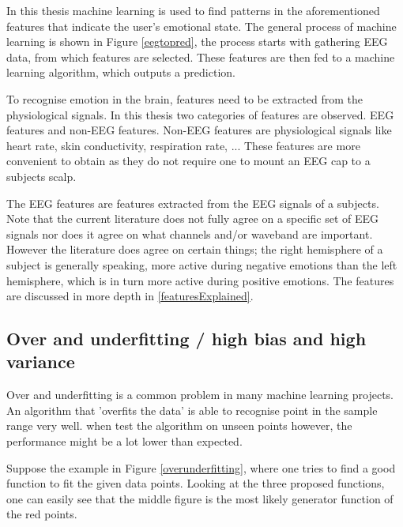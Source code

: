\npar

In this thesis machine learning is used to find patterns in the aforementioned features that indicate the user's emotional state. The general process of machine learning is shown in Figure \ref{eegtopred}, the process starts with gathering EEG data, from which features are selected. These features are then fed to a machine learning algorithm, which outputs a prediction.


To recognise emotion in the brain, features need to be extracted from the physiological signals. In this thesis two categories of features are observed. EEG features and non-EEG features. Non-EEG features are physiological signals like heart rate, skin conductivity, respiration rate, ... These features are more convenient to obtain as they do not require one to mount an EEG cap to a subjects scalp. 

\npar

The EEG features are features extracted from the EEG signals of a subjects. Note that the current literature does not fully agree on a specific set of EEG signals nor does it agree on what channels and/or waveband are important. However the literature does agree on certain things; the right hemisphere of a subject is generally speaking, more active during negative emotions than the left hemisphere, which is in turn more active during positive emotions\cite{RealTimeEEGEmotion,EEGDatasets,killyPaper}. The features are discussed in more depth in \ref{featuresExplained}.

\subsection{Over and underfitting / high bias and high variance}

Over and underfitting is a common problem in many machine learning projects. An algorithm that 'overfits the data' is able to recognise point in the sample range very well. when test the algorithm on unseen points however, the performance might be a lot lower than expected.


Suppose the example in Figure \ref{overunderfitting}, where one tries to find a good function to fit the given data points. Looking at the three proposed functions, one can easily see that the middle figure is the most likely generator function of the red points. 

